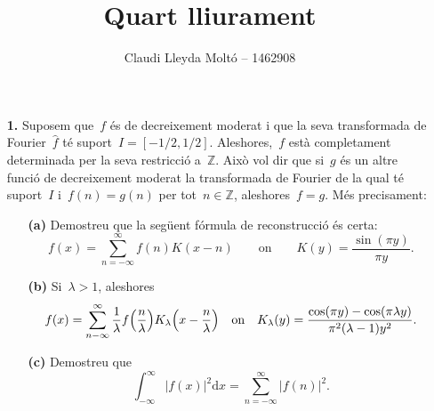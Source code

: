 \documentclass[a4paper]{article}
\title{Quart lliurament}
\author{Claudi Lleyda Moltó -- 1462908}
\theoremstyle{plain}
\providecommand{\uppi}{\pi}
\newcommand{\diff}{\mathrm{d}}
\newcommand{\abs}[1]{\lvert{#1}\rvert}
\newcommand{\ZZ}{\mathbb{Z}}
\begin{document}
\maketitle

\begin{enumerate}
    \item[\textbf{1.}] Suposem que~\(f\) és de decreixement moderat i que la
        seva transformada de Fourier~\(\widehat{f}\) té suport~\(I=[-1/2,1/2]\).
        Aleshores,~\(f\) està completament determinada per la seva restricció
        a~\(\ZZ\).
        Això vol dir que si~\(g\) és un altre funció de decreixement moderat la
        transformada de Fourier de la qual té suport~\(I\) i~\(f(n)=g(n)\) per
        tot~\(n\in\ZZ\), aleshores~\(f=g\).
        Més precisament:
        \begin{enumerate}
            \item[\textbf{(a)}] Demostreu que la següent fórmula de reconstrucció
                és certa:
                \[
                    f(x) = \sum_{n=-\infty}^{\infty} f(n) K(x-n)
                    \qquad\text{on}\qquad
                    K(y) = \frac{\sin(\uppi y)}{\uppi y}.
                \]
        \end{enumerate}
\end{enumerate}

\begin{enumerate}
    \item[]\begin{enumerate}
        \item[\textbf{(b)}] Si~\(\lambda > 1\), aleshores
            \[
                f(x) =
                \sum_{n-\infty}^{\infty}
                \frac{1}{\lambda} f\Bigl(\frac{n}{\lambda}\Bigr)
                K_{\lambda}\Bigl(x-\frac{n}{\lambda}\Bigr)
                \quad\text{on}\quad
                K_{\lambda}(y) =
                \frac{\cos(\uppi y) - \cos(\uppi\lambda y)}
                {\uppi^{2}(\lambda-1)y^{2}}.
            \]
    \end{enumerate}
\end{enumerate}

\begin{enumerate}
    \item[]\begin{enumerate}
        \item[\textbf{(c)}] Demostreu que
            \[
                \int_{-\infty}^{\infty}
                \abs{f(x)}^{2}
                \diff x
                =
                \sum_{n=-\infty}^{\infty}
                \abs{f(n)}^{2}.
            \]
    \end{enumerate}
\end{enumerate}
\end{document}
